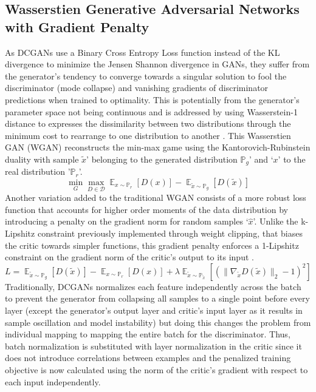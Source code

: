 \documentclass{Configuration_Files/PoliMi3i_thesis}
\begin{document}
\subsection{Wasserstien Generative Adversarial Networks with Gradient Penalty}
\label{wgan-gp}
As DCGANs use a Binary Cross Entropy Loss function instead of the KL divergence 
to minimize the Jensen Shannon divergence in GANs, they suffer from the 
generator’s tendency to converge towards a singular solution to fool the 
discriminator (mode collapse) and vanishing gradients of discriminator predictions 
when trained to optimality. This is potentially from the generator’s parameter space 
not being continuous and is addressed by using Wasserstein-1 distance to expresses 
the dissimilarity between two distributions through the minimum cost to rearrange 
to one distribution to another \cite{MaA17}. This Wasserstien GAN (WGAN) reconstructs the 
min-max game using the Kantorovich-Rubinstein duality with sample $\tilde{x}$’ 
belonging to the generated distribution $\mathbb{P}_{g}$’ and ‘$x$’ to the real distribution '$\mathbb{P}_{r}$’.
\begin{equation} \label{eq:wganopt}
\min_{G}\max_{D\in\mathcal{D}}\mathop{{}\mathbb{E}}_{x\sim\mathbb{P}_{r}}[D(x)]- \mathop{{}\mathbb{E}}_{\tilde{x}\sim\mathbb{P}_{g}}[D(\tilde{x})]
\end{equation}
Another variation added to the traditional WGAN consists of a more robust loss 
function that accounts for higher order moments of the data distribution by 
introducing a penalty on the gradient norm for random samples ‘$\hat{x}$’. Unlike 
the k-Lipshitz constraint previously implemented through weight clipping, that biases the 
critic towards simpler functions, this gradient penalty enforces a 1-Lipshitz 
constraint on the gradient norm of the critic’s output to its input \cite{IsG17}.
\begin{equation} \label{eq:wganloss}
L = \mathop{{}\mathbb{E}}_{\tilde{x}\sim\mathbb{P}_{g}}[D(\tilde{x})] - \mathop{{}\mathbb{E}}_{x\sim\mathbb{P}_{r}}[D(x)] + \lambda\mathop{{}\mathbb{E}}_{\tilde{x}\sim\mathbb{P}_{\tilde{x}}}[(\|\nabla_{\tilde{x}}D(\tilde{x})\|_{2}-1)^2]
\end{equation}
Traditionally, DCGANs normalizes each feature independently across the batch to 
prevent the generator from collapsing all samples to a single point before every layer 
(except the generator’s output layer and critic’s input layer as it results in sample 
oscillation and model instability) but doing this changes the problem from individual 
mapping to mapping the entire batch for the discriminator. Thus, batch 
normalization is substituted with layer normalization in the critic since it does not 
introduce correlations between examples and the penalized training objective is now 
calculated using the norm of the critic’s gradient with respect to each input 
independently. 
\newpage
\end{document}
